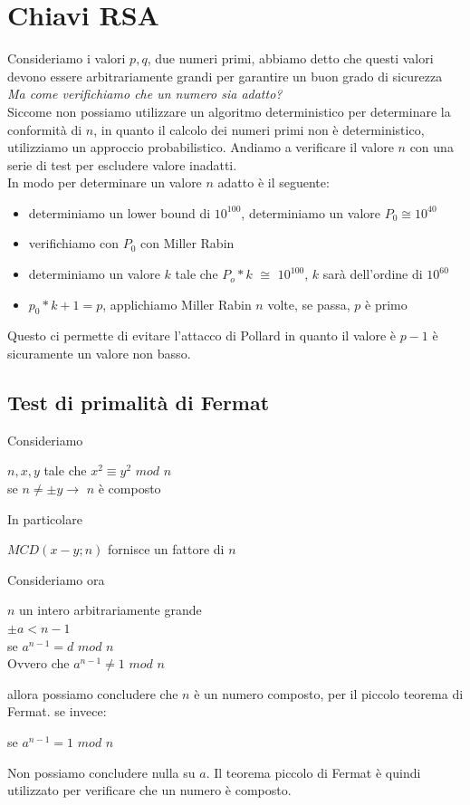 \documentclass[11pt, oneside]{article}   	%
\begin{document}
\section*{Chiavi RSA}
Consideriamo i valori $p,q$, due numeri primi, abbiamo detto che questi valori devono essere arbitrariamente grandi per garantire un buon grado di sicurezza\\
\emph{Ma come verifichiamo che un numero sia adatto?}\\
Siccome non possiamo utilizzare un algoritmo deterministico per determinare la conformità di $n$, in quanto il calcolo dei numeri primi non è deterministico, utilizziamo un approccio probabilistico. Andiamo a verificare il valore $n$ con una serie di test per escludere valore inadatti.\\
In modo per determinare un valore $n$ adatto è il seguente:
\begin{itemize}
\item determiniamo un lower bound di $10^{100}$, determiniamo un valore $P_0 \cong10^{40}$
\item verifichiamo con $P_0$ con Miller Rabin
\item determiniamo un valore $k$ tale che $P_o * k$ $\cong$ $10^{100}$, $k$ sarà dell'ordine di $10^{60}$
\item $p_0 * k+1 = p$, applichiamo Miller Rabin $n$ volte, se passa, $p$ è primo
\end{itemize}
Questo ci permette di evitare l'attacco di Pollard in quanto il valore è $p-1$ è sicuramente un valore non basso.
\subsection*{Test di primalità di Fermat}
Consideriamo
\begin{center}
$n, x, y$ tale che $x^2 \equiv y^2$ $mod$ $n$\\
se $n \neq \pm y \rightarrow$ $n$ è composto
\end{center}
In particolare
\begin{center}
$MCD(x-y; n)$ fornisce un fattore di $n$
\end{center}
Consideriamo ora \begin{center}
$n$ un intero arbitrariamente grande\\
$\pm a < n-1$\\
se $a^{n-1} = d$ $mod$ $n$\\
Ovvero che $a^{n-1} \neq 1$ $mod$ $n$
\end{center}
allora possiamo concludere che $n$ è  un numero composto, per il piccolo teorema di Fermat.
se invece: 
\begin{center}
se $a^{n-1} = 1$ $mod$ $n$
\end{center}
Non possiamo concludere nulla su $a$. Il teorema piccolo di Fermat è quindi utilizzato per verificare che un numero è composto.\\
\end{document}
